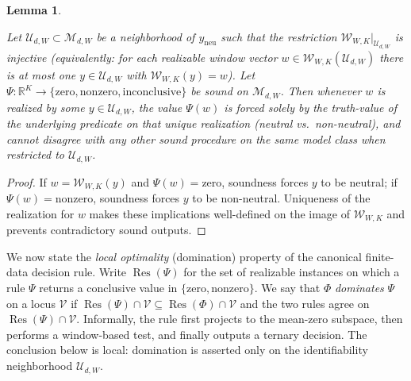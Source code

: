 \documentclass[11pt,reqno]{amsart}
\newtheorem{lemma}[theorem]{Lemma}
\theoremstyle{definition}
\theoremstyle{remark}
\newcommand{\R}{\mathbb{R}}
\newcommand{\1}{\mathbf{1}}
\newcommand{\zero}{\mathrm{zero}}
\newcommand{\nonzero}{\mathrm{nonzero}}
\newcommand{\inconclusive}{\mathrm{inconclusive}}
\begin{document}
\begin{lemma}\label{lem:sound-factors}

Let $\mathcal{U}_{d,W}\subset\mathcal{M}_{d,W}$ be a neighborhood of $y_{\mathrm{neu}}$ such that the restriction
$\mathcal{W}_{W,K}\vert_{\mathcal{U}_{d,W}}$ is injective (equivalently: for each realizable window vector
$w\in\mathcal{W}_{W,K}(\mathcal{U}_{d,W})$ there is at most one $y\in\mathcal{U}_{d,W}$ with $\mathcal{W}_{W,K}(y)=w$).
Let $\Psi:\R^K\to\{\zero,\nonzero,\inconclusive\}$ be sound on $\mathcal{M}_{d,W}$.
Then whenever $w$ is realized by some $y\in\mathcal{U}_{d,W}$, the value $\Psi(w)$ is forced solely by the
truth-value of the underlying predicate on that unique realization (neutral vs.\ non-neutral), and cannot
disagree with any other sound procedure on the same model class when restricted to $\mathcal{U}_{d,W}$.

\end{lemma}

\begin{proof}
If $w=\mathcal{W}_{W,K}(y)$ and $\Psi(w)=\zero$, soundness forces $y$ to be neutral; if $\Psi(w)=\nonzero$,
soundness forces $y$ to be non-neutral. Uniqueness of the realization for $w$ makes these implications
well-defined on the image of $\mathcal{W}_{W,K}$ and prevents contradictory sound outputs.
\end{proof}

We now state the \emph{local optimality} (domination) property of the canonical finite-data decision rule.
Write $\operatorname{Res}(\Psi)$ for the set of realizable instances on which a rule $\Psi$ returns a conclusive value in $\{\zero,\nonzero\}$.
We say that $\Phi$ \emph{dominates} $\Psi$ on a locus $\mathcal{V}$ if $\operatorname{Res}(\Psi)\cap\mathcal{V}\subseteq\operatorname{Res}(\Phi)\cap\mathcal{V}$ and the two rules agree on $\operatorname{Res}(\Psi)\cap\mathcal{V}$.
Informally, the rule first projects to the mean-zero subspace, then performs a window-based test, and finally outputs a ternary decision. The conclusion below is local: domination is asserted only on the identifiability neighborhood $\mathcal{U}_{d,W}$.
\end{document}
